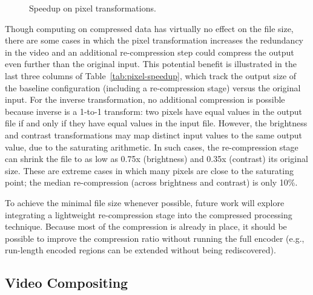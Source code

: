 \begin{figure}[t]
\centering
{}
\caption[Speedup graph for pixel transformations]{Speedup on pixel transformations.
\protect\label{fig:pixel-speedup}}
\end{figure}

Though computing on compressed data has virtually no effect on the
file size, there are some cases in which the pixel transformation
increases the redundancy in the video and an additional re-compression
step could compress the output even further than the original input.
This potential benefit is illustrated in the last three columns of
Table~\ref{tab:pixel-speedup}, which track the output size of the
baseline configuration (including a re-compression stage) versus the
original input.  For the inverse transformation, no additional
compression is possible because inverse is a 1-to-1 transform: two
pixels have equal values in the output file if and only if they have
equal values in the input file.  However, the brightness and contrast
transformations may map distinct input values to the same output
value, due to the saturating arithmetic.  In such cases, the
re-compression stage can shrink the file to as low as 0.75x
(brightness) and 0.35x (contrast) its original size.  These are
extreme cases in which many pixels are close to the saturating point;
the median re-compression (across brightness and contrast) is only
10\%.

To achieve the minimal file size whenever possible, future work will
explore integrating a lightweight re-compression stage into the
compressed processing technique.  Because most of the compression is
already in place, it should be possible to improve the compression
ratio without running the full encoder (e.g., run-length encoded
regions can be extended without being rediscovered).  

%

\subsection*{Video Compositing}

